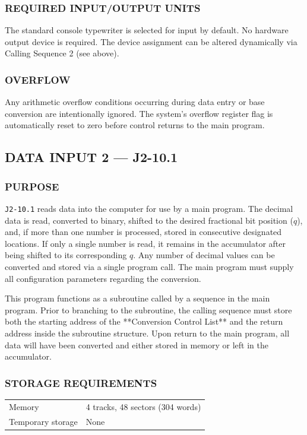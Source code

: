 \subsubsection*{REQUIRED INPUT/OUTPUT UNITS}
The standard console typewriter is selected for input by default. No hardware output device is required. The device assignment can be altered dynamically via Calling Sequence 2 (see above).

\subsubsection*{OVERFLOW}
Any arithmetic overflow conditions occurring during data entry or base conversion are intentionally ignored. The system's overflow register flag is automatically reset to zero before control returns to the main program.
\newpage

\subsection*{DATA INPUT 2 --- J2-10.1}
\label{sec:data-input-2}

\subsubsection*{PURPOSE}
\texttt{J2-10.1} reads data into the computer for use by a main program. The decimal data is read, converted to binary, shifted to the desired fractional bit position ($q$), and, if more than one number is processed, stored in consecutive designated locations. If only a single number is read, it remains in the accumulator after being shifted to its corresponding $q$. Any number of decimal values can be converted and stored via a single program call. The main program must supply all configuration parameters regarding the conversion.

This program functions as a subroutine called by a sequence in the main program. Prior to branching to the subroutine, the calling sequence must store both the starting address of the **Conversion Control List** and the return address inside the subroutine structure. Upon return to the main program, all data will have been converted and either stored in memory or left in the accumulator.

\subsubsection*{STORAGE REQUIREMENTS}
\begin{center}
\begin{tabular}{ll}
    \toprule
    Memory & 4 tracks, 48 sectors (304 words) \\
    Temporary storage    & None \\
    \bottomrule
\end{tabular}
\end{center}

